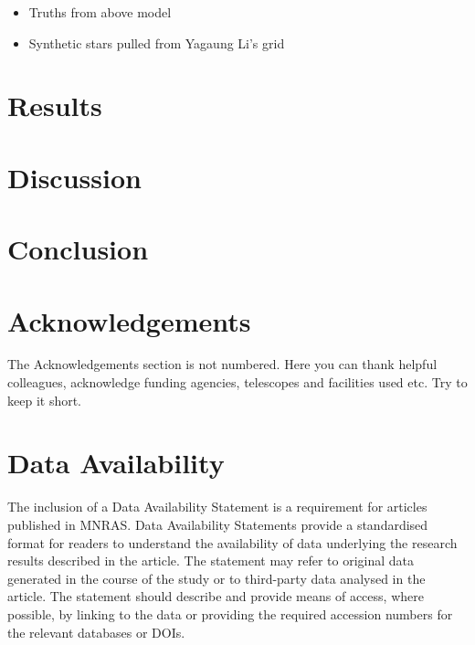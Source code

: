 \documentclass[fleqn,usenatbib]{mnras}
\begin{document}
\begin{itemize}
    \item Truths from above model
    \item Synthetic stars pulled from Yagaung Li's grid
\end{itemize}


\section{Results}
\label{sec:results}

\section{Discussion}
\label{sec:discussion}

\section{Conclusion}
\label{sec:conclusion}

\section*{Acknowledgements}

The Acknowledgements section is not numbered. Here you can thank helpful
colleagues, acknowledge funding agencies, telescopes and facilities used etc.
Try to keep it short.

\section*{Data Availability}
 
The inclusion of a Data Availability Statement is a requirement for articles published in MNRAS. Data Availability Statements provide a standardised format for readers to understand the availability of data underlying the research results described in the article. The statement may refer to original data generated in the course of the study or to third-party data analysed in the article. The statement should describe and provide means of access, where possible, by linking to the data or providing the required accession numbers for the relevant databases or DOIs.




\end{document}
